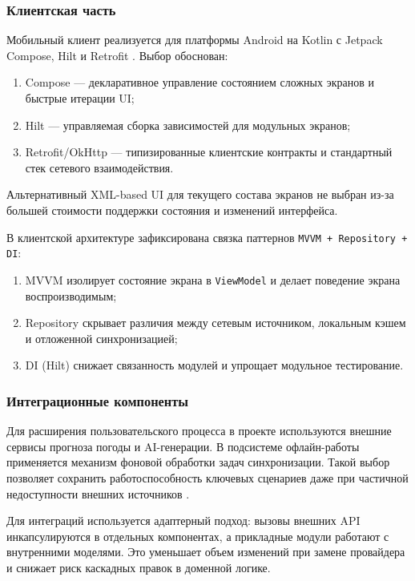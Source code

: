 \subsubsection{Клиентская часть}
Мобильный клиент реализуется для платформы Android на Kotlin с Jetpack Compose, Hilt и Retrofit . Выбор обоснован:
\begin{enumerate}
    \item Compose --- декларативное управление состоянием сложных экранов и быстрые итерации UI;
    \item Hilt --- управляемая сборка зависимостей для модульных экранов;
    \item Retrofit/OkHttp --- типизированные клиентские контракты и стандартный стек сетевого взаимодействия.
\end{enumerate}

Альтернативный XML-based UI для текущего состава экранов не выбран из-за большей стоимости поддержки состояния и изменений интерфейса.

В клиентской архитектуре зафиксирована связка паттернов \texttt{MVVM + Repository + DI}:
\begin{enumerate}
    \item MVVM изолирует состояние экрана в \texttt{ViewModel} и делает поведение экрана воспроизводимым;
    \item Repository скрывает различия между сетевым источником, локальным кэшем и отложенной синхронизацией;
    \item DI (Hilt) снижает связанность модулей и упрощает модульное тестирование.
\end{enumerate}

\subsubsection{Интеграционные компоненты}
Для расширения пользовательского процесса в проекте используются внешние сервисы прогноза погоды и AI-генерации. В подсистеме офлайн-работы применяется механизм фоновой обработки задач синхронизации. Такой выбор позволяет сохранить работоспособность ключевых сценариев даже при частичной недоступности внешних источников .

Для интеграций используется адаптерный подход: вызовы внешних API инкапсулируются в отдельных компонентах, а прикладные модули работают с внутренними моделями. Это уменьшает объем изменений при замене провайдера и снижает риск каскадных правок в доменной логике.

